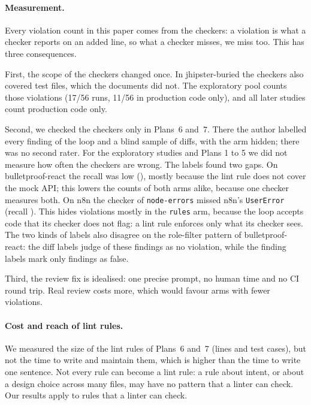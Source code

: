 \documentclass[pdflatex,sn-basic]{sn-jnl}
\newcommand{\arm}[1]{\texttt{#1}}
\begin{document}
\paragraph{Measurement.}
Every violation count in this paper comes from the checkers: a violation is what a checker reports on an added line, so what a checker misses, we miss too.
This has three consequences.

First, the scope of the checkers changed once.
In jhipster-buried the checkers also covered test files, which the documents did not.
The exploratory pool counts those violations (17/56 runs, 11/56 in production code only), and all later studies count production code only.

Second, we checked the checkers only in Plans~6 and~7.
There the author labelled every finding of the loop and a blind sample of diffs, with the arm hidden; there was no second rater.
For the exploratory studies and Plans 1 to 5 we did not measure how often the checkers are wrong.
The labels found two gaps.
On bulletproof-react the recall was low (\PSixBPRecall), mostly because the lint rule does not cover the mock API; this lowers the counts of both arms alike, because one checker measures both.
On n8n the checker of \texttt{node-errors} missed n8n's \texttt{UserError} (recall \PSevenRecall).
This hides violations mostly in the \arm{rules} arm, because the loop accepts code that its checker does not flag: a lint rule enforces only what its checker sees.
The two kinds of labels also disagree on the role-filter pattern of bulletproof-react: the diff labels judge \PSixBPFpRole{} of these findings as no violation, while the finding labels mark only \PSixAfterFalse{} findings as false.

Third, the review fix is idealised: one precise prompt, no human time and no CI round trip.
Real review costs more, which would favour arms with fewer violations.

\paragraph{Cost and reach of lint rules.}
We measured the size of the lint rules of Plans~6 and~7 (lines and test cases), but not the time to write and maintain them, which is higher than the time to write one sentence.
Not every rule can become a lint rule: a rule about intent, or about a design choice across many files, may have no pattern that a linter can check.
Our results apply to rules that a linter can check.
\end{document}
